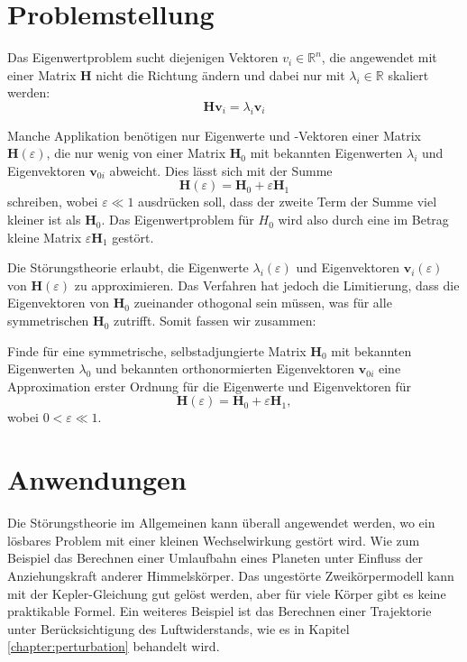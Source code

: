 %
%
\section{Problemstellung
\label{ew:section:problemstellung}}
Das Eigenwertproblem sucht diejenigen Vektoren $v_i \in \mathbb{R}^{n} $, die angewendet mit einer Matrix $\bm H$ nicht die Richtung ändern und dabei nur mit $\lambda_i \in \mathbb{R}$ skaliert werden:
\begin{equation}
    \bm H \bm v_i = \lambda_i \bm v_i \label{ew:eq:eig}
\end{equation}

Manche Applikation benötigen nur Eigenwerte und -Vektoren einer Matrix $\bm H(\varepsilon)$, die nur wenig von einer Matrix $\bm H_0$ mit bekannten Eigenwerten $\lambda_{i}$ und Eigenvektoren $\bm v_{0i}$ abweicht.
Dies lässt sich mit der Summe
\begin{equation}
    \bm H(\varepsilon) = \bm H_0 + \varepsilon \bm H_1
\end{equation}
schreiben, wobei $\varepsilon \ll 1 $ ausdrücken soll, dass der zweite Term der Summe viel kleiner ist als $\bm H_0$.
Das Eigenwertproblem für $H_0$ wird also durch eine im Betrag kleine Matrix $ \varepsilon \bm H_1$ gestört.

Die Störungstheorie erlaubt, die Eigenwerte $\lambda_i(\varepsilon)$ und Eigenvektoren  $\bm v_i(\varepsilon)$ von $\bm H(\varepsilon)$ zu approximieren.
Das Verfahren hat jedoch die Limitierung, dass die Eigenvektoren von $\bm H_0$ zueinander othogonal sein müssen, was für alle symmetrischen $\bm H_0$ zutrifft.
Somit fassen wir zusammen:
\begin{ewproblem*}
Finde für eine symmetrische, selbstadjungierte Matrix $\bm H_0$ mit bekannten Eigenwerten $\lambda_{0}$ und bekannten orthonormierten Eigenvektoren $\bm v_{0i}$ eine Approximation erster Ordnung für die Eigenwerte und Eigenvektoren für
\begin{equation*}
    \bm H(\varepsilon) = \bm H_0 + \varepsilon \bm H_1,
\end{equation*}
wobei $ 0 < \varepsilon \ll 1$.
\end{ewproblem*}

\section{Anwendungen}
Die Störungstheorie im Allgemeinen kann überall angewendet werden, wo ein lösbares Problem mit einer kleinen Wechselwirkung gestört wird.
Wie zum Beispiel das Berechnen einer Umlaufbahn eines Planeten unter Einfluss der Anziehungskraft anderer Himmelskörper.
%
%
Das ungestörte Zweikörpermodell kann mit der Kepler-Gleichung gut gelöst werden, aber für viele Körper gibt es keine praktikable Formel.
%
%
Ein weiteres Beispiel ist das Berechnen einer Trajektorie unter Berücksichtigung des Luftwiderstands, wie es in Kapitel \ref{chapter:perturbation} behandelt wird.
%

